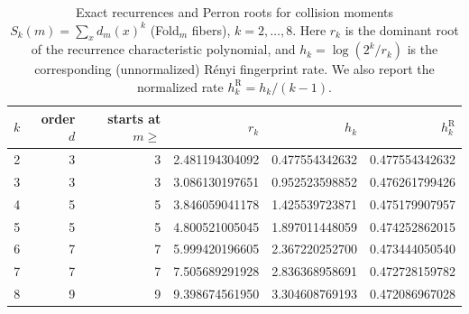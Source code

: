 \begin{table}[H]
\centering
\scriptsize
\setlength{\tabcolsep}{6pt}
\caption{Exact recurrences and Perron roots for collision moments $S_k(m)=\sum_x d_m(x)^k$ (Fold$_m$ fibers), $k=2,\dots,8$. Here $r_k$ is the dominant root of the recurrence characteristic polynomial, and $h_k=\log(2^k/r_k)$ is the corresponding (unnormalized) R\'enyi fingerprint rate. We also report the normalized rate $h_k^{\mathrm R}=h_k/(k-1)$.}
\label{tab:fold_collision_moment_spectrum_k2_8}
\begin{tabular}{r r r r r r}
\toprule
$k$ & order $d$ & starts at $m\ge$ & $r_k$ & $h_k$ & $h_k^{\mathrm R}$\\
\midrule
2 & 3 & 3 & 2.481194304092 & 0.477554342632 & 0.477554342632\\
3 & 3 & 3 & 3.086130197651 & 0.952523598852 & 0.476261799426\\
4 & 5 & 5 & 3.846059041178 & 1.425539723871 & 0.475179907957\\
5 & 5 & 5 & 4.800521005045 & 1.897011448059 & 0.474252862015\\
6 & 7 & 7 & 5.999420196605 & 2.367220252700 & 0.473444050540\\
7 & 7 & 7 & 7.505689291928 & 2.836368958691 & 0.472728159782\\
8 & 9 & 9 & 9.398674561950 & 3.304608769193 & 0.472086967028\\
\bottomrule
\end{tabular}
\end{table}
